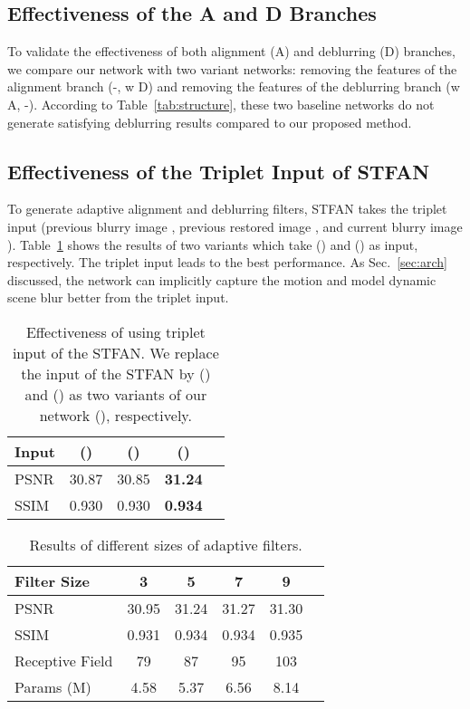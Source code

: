 \documentclass[10pt,twocolumn,letterpaper]{article}
\begin{document}
\subsection{Effectiveness of the A and D Branches}
To validate the effectiveness of both alignment (A) and deblurring (D) branches, we compare our network with two variant networks:
removing the features of the alignment branch (-, w D)
and removing the features of the deblurring branch (w A, -).
According to Table~\ref{tab:structure}, these two baseline networks do not generate satisfying deblurring results compared to our proposed method.
\subsection{Effectiveness of the Triplet Input of STFAN}
\label{sec: Effectiveness of the Triplet Input of STFAN}
To generate adaptive alignment and deblurring filters, STFAN takes the triplet input (previous blurry image , previous restored image , and current blurry image ).
Table~\ref{tab:input} shows the results of two variants which take () and () as input, respectively.
The triplet input leads to the best performance.
As Sec.~\ref{sec:arch} discussed, the network can implicitly capture the motion and model dynamic scene blur better from the triplet input.
\begin{table}[h]
\vspace{-1mm}
\centering
\caption{Effectiveness of using triplet input of the STFAN.
We replace the input of the STFAN by () and () as two variants of our network (), respectively.}
	\vspace{-1mm}
\resizebox{0.82\linewidth}{!} {
	\begin{tabular}{lcccc}
		\toprule
		Input       & ()  & ()  & () \\
		\midrule
		PSNR         & 30.87               & 30.85              & \bf{31.24}   \\
		SSIM          & 0.930               & 0.930              & \bf{0.934}   \\
		\bottomrule
	\end{tabular}
}
\label{tab:input}
\vspace{-1mm}
\end{table}
\begin{table}[h]
	\centering
	\caption{Results of different sizes of adaptive filters.}
	\vspace{-1mm}
	\resizebox{0.8\linewidth}{!} {
		\begin{tabular}{lccccc}
			\toprule
			Filter Size    &  3             &  5             &  7       &  9\\
			\midrule
			PSNR          & 30.95              & 31.24       & 31.27            & 31.30  \\
			SSIM           & 0.931              & 0.934       & 0.934            & 0.935  \\
			\midrule
			Receptive Field & 79             & 87            & 95      & 103\\
			Params (M) & 4.58         &  5.37        & 6.56        &8.14\\
			\bottomrule
		\end{tabular}
	}
	\label{tab:filter_size}
	\vspace{-4mm}
\end{table}
\end{document}

